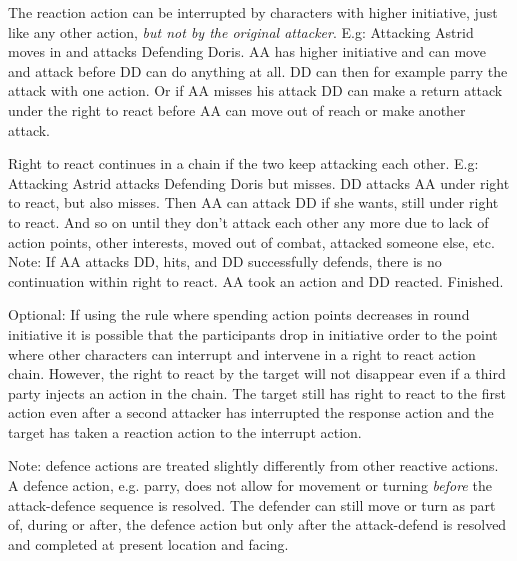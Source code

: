 The reaction action can be interrupted by characters with higher initiative, just like any other action, \emph{but not by the original attacker}. 
E.g: Attacking Astrid moves in and attacks Defending Doris. AA has higher initiative and can move and attack before DD can do anything at all. DD can then for example parry the attack with one action. Or if AA misses his attack DD can make a return attack under the right to react before AA can move out of reach or make another attack.

Right to react continues in a chain if the two keep attacking each other.
E.g: Attacking Astrid attacks Defending Doris but misses. DD attacks AA under right to react, but also misses. Then AA can attack DD if she wants, still under right to react. And so on until they don't attack each other any more due to lack of action points, other interests, moved out of combat, attacked someone else, etc.\\
Note: If AA attacks DD, hits, and DD successfully defends, there is no continuation within right to react. AA took an action and DD reacted. Finished.

Optional: If using the rule where spending action points decreases in round initiative it is possible that the participants drop in initiative order to the point where other characters can interrupt and intervene in a right to react action chain. However, the right to react by the target will not disappear even if a third party injects an action in the chain. The target still has right to react to the first action even after a second attacker has interrupted the response action and the target has taken a reaction action to the interrupt action.

Note: defence actions are treated slightly differently from other reactive actions. A defence action, e.g. parry, does not allow for movement or turning \emph{before} the attack-defence sequence is resolved. The defender can still move or turn as part of, during or after, the defence action but only after the attack-defend is resolved and completed at present location and facing.



